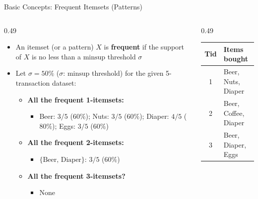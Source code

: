 \documentclass[aspectratio=169, 11pt]{beamer}
\begin{document}
\begin{frame}{Basic Concepts: Frequent Itemsets (Patterns)}
    \begin{columns}[T]
        \begin{column}{0.49\textwidth}
            \small
            \begin{itemize}
                \item An itemset (or a pattern) $X$ is \textbf{frequent} if the support of $X$ is no less than a $\text{minsup}$ threshold $\sigma$
                \item Let $\sigma = 50\%$ ($\sigma$: $\text{minsup}$ threshold) for the given 5-transaction dataset:
                \begin{itemize}
                    \item \textbf{All the frequent 1-itemsets:}
                    \begin{itemize}
                        \item Beer: $3/5$ ($60\%$); Nuts: $3/5$ ($60\%$); Diaper: $4/5$ ($80\%$); Eggs: $3/5$ ($60\%$)
                    \end{itemize}
                    \item \textbf{All the frequent 2-itemsets:}
                    \begin{itemize}
                        \item $\{\text{Beer, Diaper}\}$: $3/5$ ($60\%$)
                    \end{itemize}
                    \item \textbf{All the frequent 3-itemsets?}
                    \begin{itemize}
                        \item None
                    \end{itemize}
                \end{itemize}
            \end{itemize}
        \end{column}
        \begin{column}{0.49\textwidth}
            \centering
            \footnotesize
            \begin{tabular}{cl}
                \toprule
                \textbf{Tid} & \textbf{Items bought} \\
                \midrule
                1 & Beer, Nuts, Diaper \\
                2 & Beer, Coffee, Diaper \\
                3 & Beer, Diaper, Eggs \\

\end{tabular}
\end{column}
\end{columns}
\end{frame}
\end{document}
